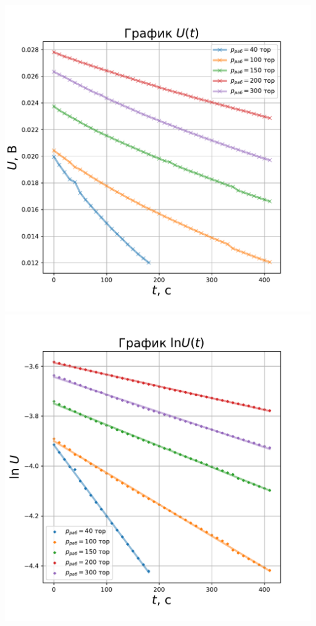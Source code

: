 \documentclass[a4paper, 12pt]{article}
\begin{document}
\includegraphics[scale = 0.6]{Picturies/exp.pdf} \\
\includegraphics[scale = 0.6]{Picturies/ln.pdf}
\end{document}

